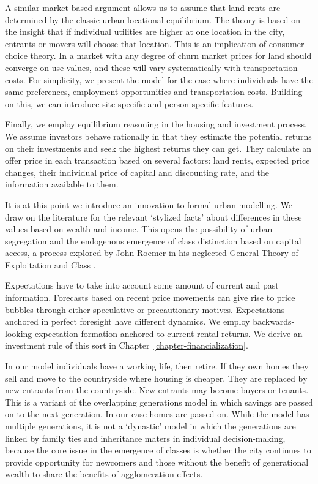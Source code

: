 A similar market-based argument allows us to assume that land rents are determined by the classic urban locational equilibrium. The theory is based on the insight that if individual utilities are higher at one location in the city, entrants or movers will choose that  location. This is an implication of consumer choice theory. In a market with any degree of churn market prices for land should converge on use values, and these will vary systematically with transportation costs. For simplicity, we present the model for the case where individuals have the same preferences, employment opportunities and transportation costs. Building on this, %
we can introduce site-specific and person-specific features. 

Finally, we employ equilibrium reasoning in the housing and investment process. We assume investors behave rationally in that they estimate the potential returns on their investments and seek the highest returns they can get. They calculate an offer price in each transaction based on several factors: land rents, expected price changes, their individual price of capital and discounting rate, and the information available to them.

It is at this point we introduce an innovation to formal urban modelling. We draw on the literature for the relevant `stylized facts' about differences in these values based on wealth and income. This opens the possibility of urban segregation and the endogenous emergence of class distinction based on capital access, a process explored by John Roemer in his neglected General Theory of Exploitation and Class \cite{roemerGeneralTheoryExploitation1982}.  

Expectations have to take into account some amount of current and past information. Forecasts based on recent price movements can give rise to price bubbles through either speculative or precautionary motives. Expectations anchored in perfect foresight have different dynamics. We employ backwards-looking expectation formation anchored to current rental returns. We derive an investment rule of this sort in Chapter~\ref{chapter-financialization}. 
          
In our model individuals have a working life, then retire. If they own homes they sell and move to the countryside where housing is cheaper. They are replaced by new entrants from the countryside. New entrants may become buyers or tenants. This is a variant of the overlapping generations  model in which savings are passed on to the next generation. In our case homes are passed on. While the model has multiple generations, it is not a `dynastic' model in which the generations are linked by family ties and inheritance maters in individual decision-making, because the core issue in the emergence of classes is whether the city continues to provide opportunity for newcomers and those without the benefit of generational wealth to share the  benefits of agglomeration effects. %

